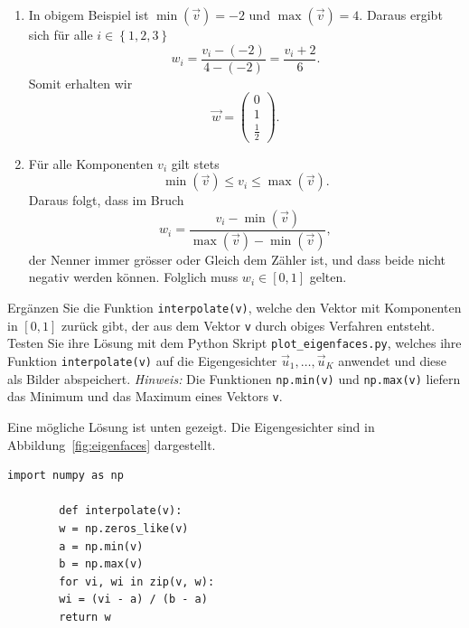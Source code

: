 \begin{losung*}
	\phantom{text}
	\begin{enumerate}[label=(\alph*)]
		\item In obigem Beispiel ist $\min\left(\vec v\right)=-2$ und $\max\left(\vec v\right)=4$.
		Daraus ergibt sich für alle $i\in\left\{1,2,3\right\}$
		\begin{equation*}
			w_i=\frac{v_i-\left(-2\right)}{4-\left(-2\right)}=\frac{v_i+2}{6}.
		\end{equation*}
		Somit erhalten wir
		\begin{equation*}
			\vec w=
			\begin{pmatrix}
				0 \\
				1 \\
				\tfrac{1}{2}
			\end{pmatrix}.
		\end{equation*}
		\item Für alle Komponenten $v_i$ gilt stets
		\begin{equation*}
			\min\left(\vec v\right)\leq v_i\leq\max\left(\vec v\right).
		\end{equation*}
		Daraus folgt, dass im Bruch
		\begin{equation*}
			w_i=\frac{v_i-\min\left(\vec v\right)}{\max\left(\vec v\right)-\min\left(\vec v\right)},
		\end{equation*}
		der Nenner immer grösser oder Gleich dem Zähler ist, und dass beide nicht negativ werden können.
		Folglich muss $w_i\in\left[0,1\right]$ gelten.
	\end{enumerate}
\end{losung*}
\begin{aufgabe} \label{aufg:scaling_code}
	Ergänzen Sie die Funktion \texttt{interpolate(v)}, welche den Vektor mit Komponenten in $\left[0,1\right]$ zurück gibt, der aus dem Vektor \texttt{v} durch obiges Verfahren entsteht.
	Testen Sie ihre Lösung mit dem Python Skript \texttt{plot\_eigenfaces.py}, welches ihre Funktion \texttt{interpolate(v)} auf die Eigengesichter $\vec u_1,\ldots,\vec u_K$ anwendet und diese als Bilder abspeichert.
	\textit{Hinweis:} Die Funktionen \texttt{np.min(v)} und \texttt{np.max(v)} liefern das Minimum und das Maximum eines Vektors \texttt{v}.
\end{aufgabe}
\begin{losung*}
	Eine mögliche Lösung ist unten gezeigt.
	Die Eigengesichter sind in Abbildung~\ref{fig:eigenfaces} dargestellt.
	\begin{lstlisting}[style=python]
		import numpy as np
		
		def interpolate(v):
		w = np.zeros_like(v)
		a = np.min(v)
		b = np.max(v)
		for vi, wi in zip(v, w):
		wi = (vi - a) / (b - a)
		return w
	\end{lstlisting}
\end{losung*}

